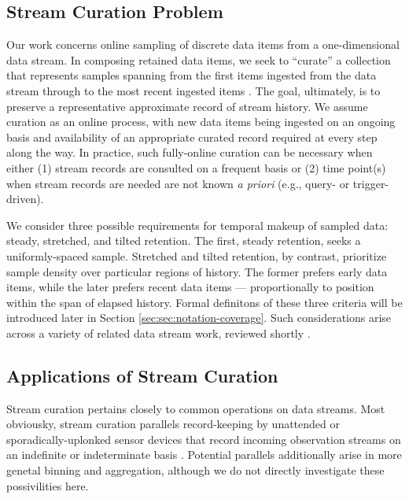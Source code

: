 \subsection{Stream Curation Problem}

Our work concerns online sampling of discrete data items from a one-dimensional data stream.
In composing retained data items, we seek to ``curate'' a collection that represents samples spanning from the first items ingested from the data stream through to the most recent ingested items \citep{moreno2024algorithms}.
The goal, ultimately, is to preserve a representative approximate record of stream history.
We assume curation as an online process, with new data items being ingested on an ongoing basis and availability of an appropriate curated record required at every step along the way.
In practice, such fully-online curation can be necessary when either (1) stream records are consulted on a frequent basis or (2) time point(s) when stream records are needed are not known \textit{a priori} (e.g., query- or trigger-driven).

We consider three possible requirements for temporal makeup of sampled data: steady, stretched, and tilted retention.
The first, steady retention, seeks a uniformly-spaced sample.
Stretched and tilted retention, by contrast, prioritize sample density over particular regions of history.
The former prefers early data items, while the later prefers recent data items --- proportionally to position within the span of elapsed history.
Formal definitons of these three criteria will be introduced later in Section \ref{sec:sec:notation-coverage}.
Such considerations arise across a variety of related data stream work, reviewed shortly \citep{aggarwal2003framework,han2005stream}.


\subsection{Applications of Stream Curation}

Stream curation pertains closely to common operations on data streams.
Most obviousky, stream curation parallels record-keeping by unattended or sporadically-uplonked sensor devices that record incoming observation streams on an indefinite or indeterminate basis \citep{jain2022survey}.
Potential parallels additionally arise in more genetal binning and aggregation, although we do not directly investigate these possivilities here.

